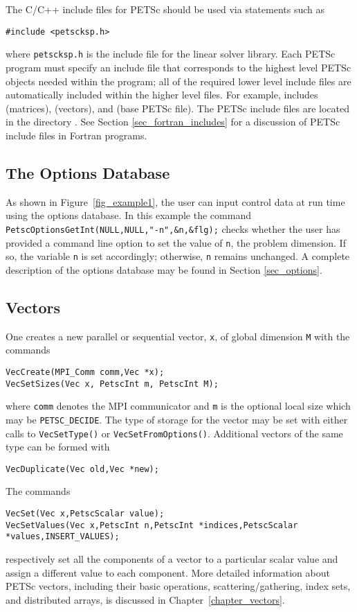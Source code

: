 The C/C++ include files for PETSc should be used via statements such as
\begin{lstlisting}
#include <petscksp.h>
\end{lstlisting}
where \lstinline{petscksp.h} is the include file for the linear solver library.
Each PETSc program must specify an
include file that corresponds to the highest level PETSc objects
needed within the program; all of the required lower level include
files are automatically included within the higher level files.  For
example,  includes  (matrices),
 (vectors), and  (base PETSc file).
The PETSc include files are located in the directory
.  See Section \ref{sec_fortran_includes}
for a discussion of PETSc include files in Fortran programs.

\subsection*{The Options Database}

As shown in Figure~\ref{fig_example1}, the user can input control data
at run time using the options database. In this example the command
\lstinline{PetscOptionsGetInt(NULL,NULL,"-n",&n,&flg);} checks whether the user has
provided a command line option to set the value of \lstinline{n}, the
problem dimension.  If so, the variable \lstinline{n} is set accordingly;
otherwise, \lstinline{n} remains unchanged. A complete description of the
options database may be found in Section \ref{sec_options}.

\subsection*{Vectors}
\label{sec_vecintro}

One creates a new parallel or
sequential vector, \lstinline{x}, of global dimension \lstinline{M} with the
commands  
\begin{lstlisting}
VecCreate(MPI_Comm comm,Vec *x);
VecSetSizes(Vec x, PetscInt m, PetscInt M);
\end{lstlisting}
where \lstinline{comm} denotes the MPI communicator and \lstinline{m} is the optional local size
which may be \lstinline{PETSC_DECIDE}. The type of storage
for the vector may be set with either calls to
\lstinline{VecSetType()} or \lstinline{VecSetFromOptions()}.
Additional vectors of the same type can be formed with
\begin{lstlisting}
VecDuplicate(Vec old,Vec *new);
\end{lstlisting}
The commands
\begin{lstlisting}
VecSet(Vec x,PetscScalar value);
VecSetValues(Vec x,PetscInt n,PetscInt *indices,PetscScalar *values,INSERT_VALUES);
\end{lstlisting}
respectively set all the components of a vector to a particular scalar
value and assign a different value to each component.  More
detailed information about PETSc vectors, including their basic
operations, scattering/gathering, index sets, and distributed arrays, is
discussed in Chapter~\ref{chapter_vectors}.

